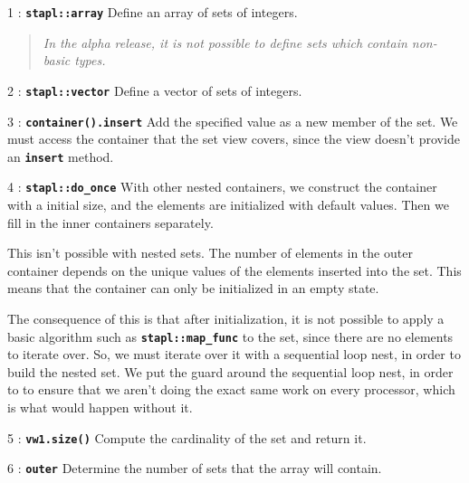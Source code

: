 \documentclass{report}
\begin{document}
\begin{hashitemize}

\item 1 : \texttt{{\bf stapl::array}}
\newline
Define an array of sets of integers.
\begin{quote}
\emph{In the alpha release, it is not
possible to define sets which contain non-basic types.}
\end{quote}

\item 2 : \texttt{{\bf stapl::vector}}
\newline
Define a vector of sets of integers.

\item 3 : \texttt{{\bf container().insert}}
\newline
Add the specified value as a new member of the set.
We must access the container that the set view covers, since the view
doesn't provide an
\texttt{{\bf insert}}
method.

\item 4 : \texttt{{\bf stapl::do\_once}}
\newline
With other nested containers, we construct the container with a initial
size, and the elements are initialized with default values.  Then we fill
in the inner containers separately.

This isn't possible with nested sets.  The number of elements in the outer
container depends on the unique values of the elements inserted into the set.
This means that the container can only be initialized in an empty state.

The consequence of this is that after initialization, it is not possible
to apply a basic algorithm such as
\texttt{{\bf stapl::map\_func}}
to the set, since there are no elements
to iterate over.  So, we must iterate over it with a sequential loop nest,
in order to build the nested set.
We put the guard around the sequential loop nest, in order to to ensure
that we aren't doing the exact same work on every processor, which is what
would happen without it.

\item 5 : \texttt{{\bf vw1.size()}}
\newline
Compute the cardinality of the set and return it.

\item 6 : \texttt{{\bf outer}}
\newline
Determine the number of sets that the array will contain.


\end{hashitemize}
\end{document}
